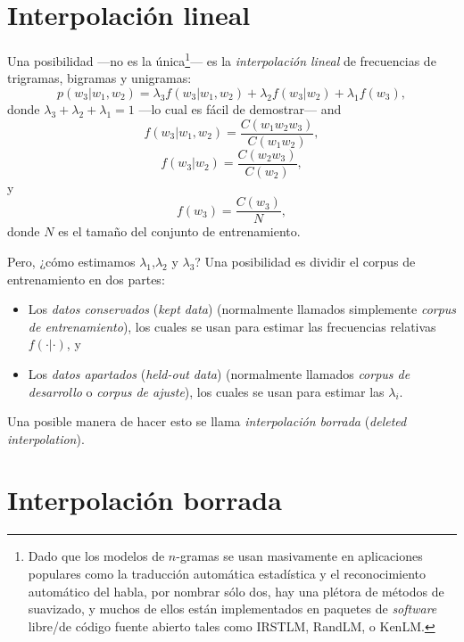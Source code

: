 \documentclass[12pt,a4paper]{article} \usepackage[spanish]{babel}
\begin{document}
\section{Interpolación lineal}

Una posibilidad ---no es la única\footnote{Dado que los modelos de \(n\)-gramas se usan masivamente en aplicaciones populares como la traducción automática estadística y el reconocimiento automático del habla, por nombrar sólo dos, hay una plétora de métodos de suavizado, y muchos de ellos están implementados en paquetes de \emph{software} libre/de código fuente abierto tales como IRSTLM, RandLM, o KenLM.}--- es la \emph{interpolación lineal} de frecuencias de trigramas, bigramas y unigramas:
\begin{equation}
  \label{eq:lininterpol}
  p(w_3|w_1,w_2)=\lambda_3f(w_3|w_1,w_2) + \lambda_2 f(w_3|w_2) + \lambda_1f(w_3),
\end{equation}
donde
\(\lambda_3+\lambda_2+\lambda_1=1\) ---lo cual es fácil de demostrar--- and
\begin{equation}
  f(w_3|w_1,w_2)=\frac{C(w_1w_2w_3)}{C(w_1w_2)},\label{eq:f3}
\end{equation}
\begin{equation}
  \label{eq:f2}
   f(w_3|w_2)=\frac{C(w_2w_3)}{C(w_2)},
\end{equation}
y
\begin{equation}
    f(w_3)=\frac{C(w_3)}{N},
\end{equation}
donde \(N\) es el tamaño del conjunto de entrenamiento.

Pero, ¿cómo estimamos \(\lambda_1\),\(\lambda_2\) y \(\lambda_3\)? Una posibilidad es dividir el corpus de entrenamiento en dos partes:
\begin{itemize}
\item Los \emph{datos conservados} (\emph{kept data}) (normalmente llamados simplemente \emph{corpus de entrenamiento}), los cuales se usan para estimar las frecuencias relativas \(f(\cdot|\cdot)\), y
\item Los \emph{datos apartados} (\emph{held-out data}) (normalmente llamados \emph{corpus de desarrollo} o \emph{corpus de ajuste}), los cuales se usan para estimar las \(\lambda_i\).
\end{itemize}
Una posible manera de hacer esto se llama \emph{interpolación borrada} (\emph{deleted interpolation}).

\section{Interpolación borrada}
\end{document}
